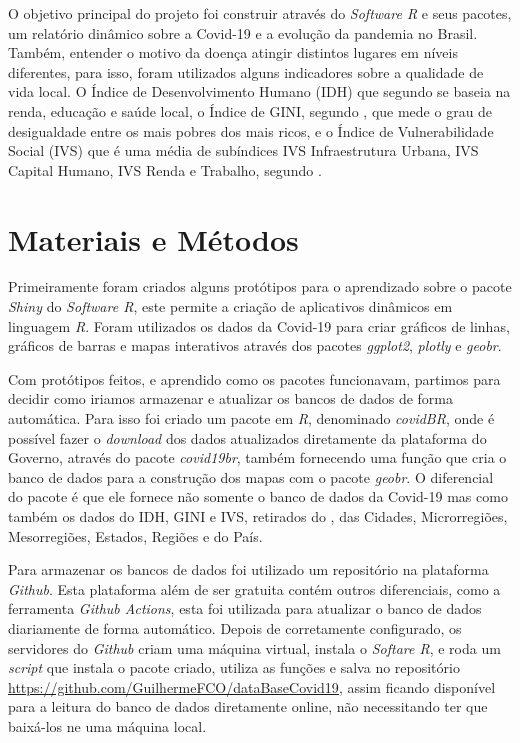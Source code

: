 \documentclass[
  fleqn,ebook]{ic}
\begin{document}
O objetivo principal do projeto foi construir através do \emph{Software R} e seus
pacotes, um relatório dinâmico sobre a Covid-19 e a evolução da pandemia no
Brasil. Também, entender o motivo da doença atingir distintos lugares em níveis
diferentes, para isso, foram utilizados alguns indicadores sobre a qualidade de
vida local. O Índice de Desenvolvimento Humano (IDH) que segundo \cite{pnudidh}
se baseia na renda, educação e saúde local, o Índice de GINI, segundo
\cite{ipeagini}, que mede o grau de desigualdade entre os mais pobres dos mais
ricos, e o Índice de Vulnerabilidade Social (IVS) que é uma média de subíndices
IVS Infraestrutura Urbana, IVS Capital Humano, IVS Renda e Trabalho, segundo
\cite{ipeaivs}.

\hypertarget{MateriaisMetodos}{%
\section{Materiais e Métodos}\label{MateriaisMetodos}}

Primeiramente foram criados alguns protótipos para o aprendizado sobre
o pacote \emph{Shiny} do \emph{Software R}, este permite a criação de aplicativos
dinâmicos em linguagem \emph{R}. Foram utilizados os dados da Covid-19 para criar
gráficos de linhas, gráficos de barras e mapas interativos através dos pacotes
\emph{ggplot2}, \emph{plotly} e \emph{geobr}.

Com protótipos feitos, e aprendido como os pacotes funcionavam, partimos para
decidir como iriamos armazenar e atualizar os bancos de dados de forma
automática. Para isso foi criado um pacote em \emph{R}, denominado \emph{covidBR},
onde é possível fazer o \emph{download} dos dados atualizados diretamente da
plataforma do Governo, através do pacote \emph{covid19br}, também fornecendo uma
função que cria o banco de dados para a construção dos mapas com o pacote
\emph{geobr}. O diferencial do pacote é que ele fornece não somente o banco de dados
da Covid-19 mas como também os dados do IDH, GINI e IVS, retirados do
\cite{atlas}, das Cidades, Microrregiões, Mesorregiões, Estados, Regiões e do
País.

Para armazenar os bancos de dados foi utilizado um repositório na plataforma
\emph{Github}. Esta plataforma além de ser gratuita contém outros diferenciais, como
a ferramenta \emph{Github Actions}, esta foi utilizada para atualizar o banco de
dados diariamente de forma automático. Depois de corretamente configurado, os
servidores do \emph{Github} criam uma máquina virtual, instala o \emph{Softare R}, e roda
um \emph{script} que instala o pacote criado, utiliza as funções e salva no
repositório \url{https://github.com/GuilhermeFCO/dataBaseCovid19}, assim ficando
disponível para a leitura do banco de dados diretamente online, não necessitando
ter que baixá-los ne uma máquina local.
\end{document}
